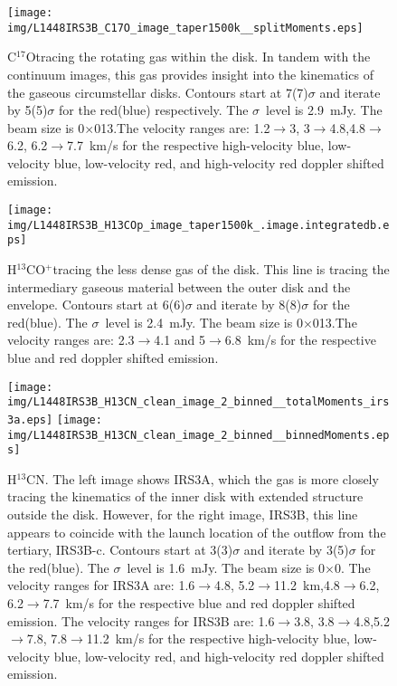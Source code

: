 \documentclass[preprint,12pt]{aastex62}
\newcommand{\htcn}{H$^{13}$CN}
\newcommand{\cso}{C$^{17}$O}
\newcommand{\htcop}{H$^{13}$CO$^+$}
\newcommand{\csobeam}{0\farcs21$\times$0\farcs13} %
\begin{document}

\begin{figure}[H]
\begin{center}
   \texttt{[image: img/L1448IRS3B\_C17O\_image\_taper1500k\_\_splitMoments.eps]} %
\end{center}
   \caption{ \cso\space tracing the rotating gas within the disk. In tandem with the continuum images, this gas provides insight into the kinematics of the gaseous circumstellar disks. Contours start at 7(7)$\sigma$ and iterate by 5(5)$\sigma$ for the red(blue) respectively. The $\sigma$~level is 2.9~mJy. The beam size is \csobeam.The velocity ranges are: 1.2$\rightarrow$3, 3$\rightarrow$4.8,4.8$\rightarrow$6.2, 6.2$\rightarrow$7.7~km/s for the respective high-velocity blue, low-velocity blue, low-velocity red, and high-velocity red doppler shifted emission.}\label{fig:c17omoment}
\end{figure}
\begin{figure}[H]
\begin{center}
   \texttt{[image: img/L1448IRS3B\_H13COp\_image\_taper1500k\_.image.integratedb.eps]} %
\end{center}
   \caption{\htcop\space tracing the less dense gas of the disk. This line is tracing the intermediary gaseous material between the outer disk and the envelope. Contours start at 6(6)$\sigma$ and iterate by 8(8)$\sigma$ for the red(blue). The $\sigma$~level is 2.4~mJy. The beam size is \csobeam.The velocity ranges are: 2.3$\rightarrow$4.1 and 5$\rightarrow$6.8~km/s for the respective blue and red doppler shifted emission.
   }\label{fig:h13copmoment}
\end{figure}
\begin{figure}[H]
\begin{center}
   \texttt{[image: img/L1448IRS3B\_H13CN\_clean\_image\_2\_binned\_\_totalMoments\_irs3a.eps]} %
   \texttt{[image: img/L1448IRS3B\_H13CN\_clean\_image\_2\_binned\_\_binnedMoments.eps]} %
\end{center}
   \caption{ \htcn\space. The left image shows IRS3A, which the gas is more closely tracing the kinematics of the inner disk with extended structure outside the disk. However, for the right image, IRS3B, this line appears to coincide with the launch location of the outflow from the tertiary, IRS3B-c. Contours start at 3(3)$\sigma$ and iterate by 3(5)$\sigma$ for the red(blue). The $\sigma$~level is 1.6~mJy. The beam size is \csobeam. The velocity ranges for IRS3A are: 1.6$\rightarrow$4.8, 5.2$\rightarrow$11.2~km,4.8$\rightarrow$6.2, 6.2$\rightarrow$7.7~km/s for the respective blue and red doppler shifted emission. The velocity ranges for IRS3B are: 1.6$\rightarrow$3.8, 3.8$\rightarrow$4.8,5.2$\rightarrow$7.8, 7.8$\rightarrow$11.2~km/s for the respective high-velocity blue, low-velocity blue, low-velocity red, and high-velocity red doppler shifted emission.
   }\label{fig:h13cnmoment}
\end{figure}
\end{document}
